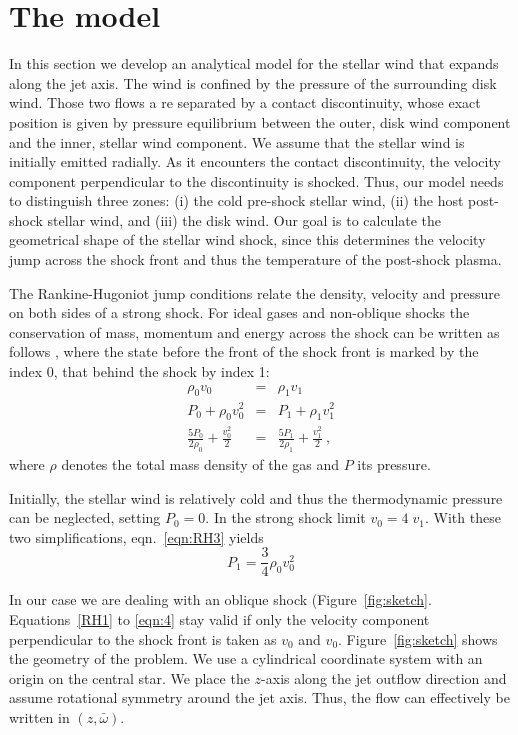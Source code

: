 \section{The model}

In this section we develop an analytical model for the stellar wind that expands along the jet axis. The wind is confined by the pressure of the surrounding disk wind. Those two flows a re separated by a contact discontinuity, whose exact position is given by pressure equilibrium between the outer, disk wind component and the inner, stellar wind component. We assume that the stellar wind is initially emitted radially. As it encounters the contact discontinuity, the velocity component perpendicular to the discontinuity is shocked. Thus, our model needs to distinguish three zones: (i) the cold pre-shock stellar wind, (ii) the host post-shock stellar wind, and (iii) the disk wind. Our goal is to calculate the geometrical shape of the stellar wind shock, since this determines the velocity jump across the shock front and thus the temperature of the post-shock plasma.

The Rankine-Hugoniot jump conditions relate the density, velocity and pressure on both sides of a strong shock. For ideal gases and non-oblique shocks the conservation of mass, momentum and energy across the shock can be written as follows \citep[][chap.~7, \S~15]{http://adsabs.harvard.edu/abs/1967pswh.book.....Z}, where the state before the front of the shock front is marked by the index 0, that behind the shock by index 1:
\begin{eqnarray}
\label{eqn:RH1}\rho_0 v_0 &=& \rho_1 v_1\\
\label{eqn:RH2}P_0+\rho_0 v_0^2 &=& P_1+\rho_1 v_1^2\\
\label{eqn:RH3}\frac{5 P_0}{2\rho_0}+\frac{v_0^2}{2}&=&\frac{5 P_1}{2\rho_1}+\frac{v_1^2}{2} \ ,
\end{eqnarray}
where $\rho$ denotes the total mass density of the gas and $P$ its pressure. 

Initially, the stellar wind is relatively cold and thus the thermodynamic pressure can be neglected, setting $P_0=0$. In the strong shock limit $v_0=4\;v_1$. With these two simplifications, eqn.~\ref{eqn:RH3} yields
\begin{equation} \label{eqn:4}
P_1 = \frac{3}{4} \rho_0 v_0^2
\end{equation}

In our case we are dealing with an oblique shock (Figure~\ref{fig:sketch}. Equations~\ref{RH1} to \ref{eqn:4} stay valid if only the velocity component perpendicular to the shock front is taken as $v_0$ and $v_0$. 
Figure~\ref{fig:sketch} shows the geometry of the problem. We use a cylindrical coordinate system with an origin on the central star. We place the $z$-axis along the jet outflow direction and assume rotational symmetry around the jet axis. Thus, the flow can effectively be written in $(z,\bar{\omega})$. 

